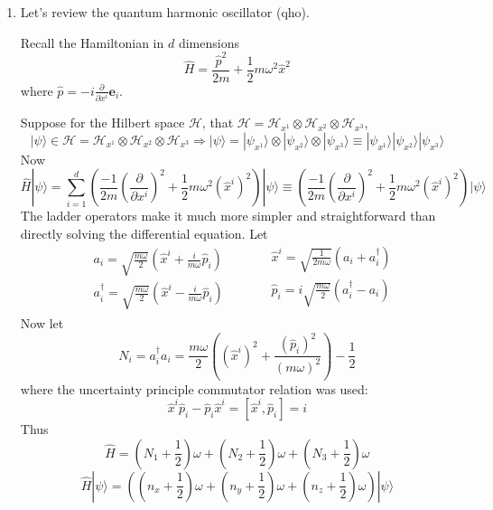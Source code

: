 \begin{enumerate}
\item[(a)] Let's review the quantum harmonic oscillator (qho).  

Recall the Hamiltonian in $d$ dimensions
\[
\widehat{H} = \frac{ \widehat{p}^2}{2m} + \frac{1}{2} m \omega^2 \widehat{x}^2
\]
where $\widehat{p} = -i \frac{ \partial }{ \partial x^i} \mathbf{e}_i$.  

Suppose for the Hilbert space $\mathcal{H}$, that $\mathcal{H} = \mathcal{H}_{x^1} \otimes \mathcal{H}_{x^2} \otimes \mathcal{H}_{x^3}$, 
\[
| \psi \rangle \in \mathcal{H} = \mathcal{H}_{x^1} \otimes \mathcal{H}_{x^2} \otimes \mathcal{H}_{x^3} \Longrightarrow |\psi \rangle = | \psi_{x^1} \rangle \otimes  | \psi_{x^2} \rangle \otimes | \psi_{x^3} \rangle \equiv | \psi_{x^1} \rangle | \psi_{x^2} \rangle | \psi_{x^3} \rangle
\]
Now
\[
\widehat{H} | \psi \rangle = \sum_{i=1}^d \left( \frac{-1}{2m} \left( \frac{ \partial }{ \partial x^i} \right)^2  + \frac{1}{2} m \omega^2 (\widehat{x}^i)^2 \right) |\psi \rangle \equiv \left( \frac{-1}{2m} \left( \frac{ \partial }{ \partial x^i} \right)^2  + \frac{1}{2} m \omega^2 (\widehat{x}^i)^2 \right) |\psi \rangle
\]
The ladder operators make it much more simpler and straightforward than directly solving the differential equation.  Let
\[
\begin{aligned}
  & a_i =  \sqrt{ \frac{m\omega}{2} } \left( \widehat{x}^i + \frac{i}{m\omega} \widehat{p}_i \right) \\
  & a_i^{\dag} = \sqrt{ \frac{m\omega}{2} } \left( \widehat{x}^i - \frac{i}{m\omega} \widehat{p}_i \right)
\end{aligned} \quad \quad \, \begin{aligned}
  & \widehat{x}^i = \sqrt{ \frac{1}{2m\omega} } (a_i + a_i^{\dag}) \\ 
  & \widehat{p}_i = i \sqrt{ \frac{m \omega}{2 } } (a_i^{\dag} - a_i ) \\ 
\end{aligned}
\]
Now let 
\[
N_i = a_i^{\dag} a_i = \frac{m\omega}{2} ((\widehat{x}^i)^2 + \frac{ (\widehat{p}_i)^2}{ (m\omega)^2 } ) - \frac{1}{2}
\]
where the uncertainty principle commutator relation was used: 
\[
\widehat{x}^i \widehat{p}_i - \widehat{p}_i\widehat{x}^i = [\widehat{x}^i , \widehat{p}_i ] =  i 
\]
Thus
\[
\widehat{H} = (N_1 + \frac{1}{2} ) \omega + (N_2 + \frac{1}{2} ) \omega + (N_3 + \frac{1}{2} ) \omega
\]
\[
\widehat{H} | \psi \rangle = ((n_x + \frac{1}{2} )\omega + (n_y + \frac{1}{2}) \omega + (n_z + \frac{1}{2} ) \omega ) | \psi \rangle
\]


\end{enumerate}
